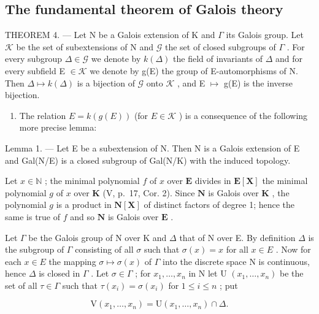 \subsection{The fundamental theorem of Galois theory}

THEOREM 4. --- Let N be a Galois extension of K and \(\Gamma\) its Galois group. Let \(\mathcal{K}\) be the set of subextensions of N and \(\mathcal{G}\) the set of closed subgroups of \(\Gamma\) . For every subgroup \(\Delta \in \mathcal{G}\) we denote by \(k(\Delta)\) the field of invariants of \(\Delta\) and for every subfield E \(\in \mathcal{K}\) we denote by g(E) the group of E-automorphisms of N. Then \(\Delta \mapsto k(\Delta)\) is a bijection of \(\mathcal{G}\) onto \(\mathcal{K}\) , and E \(\mapsto\) g(E) is the inverse bijection.

\begin{enumerate}
\def\labelenumi{\Alph{enumi})}
\tightlist
\item
  The relation \(E = k(g(E))\) (for \(E \in \mathcal{K}\) ) is a consequence of the following more precise lemma:
\end{enumerate}

Lemma 1. --- Let E be a subextension of N. Then N is a Galois extension of E and Gal(N/E) is a closed subgroup of Gal(N/K) with the induced topology.

Let \(x \in \mathbb{N}\) ; the minimal polynomial \(f\) of \(x\) over \(\mathbf{E}\) divides in \(\mathbf{E}[\mathbf{X}]\) the minimal polynomial \(g\) of \(x\) over \(\mathbf{K}\) (V, p.~17, Cor. 2). Since \(\mathbf{N}\) is Galois over \(\mathbf{K}\) , the polynomial \(g\) is a product in \(\mathbf{N}[\mathbf{X}]\) of distinct factors of degree 1; hence the same is true of \(f\) and so \(\mathbf{N}\) is Galois over \(\mathbf{E}\) .

Let \(\Gamma\) be the Galois group of N over K and \(\Delta\) that of N over E. By definition \(\Delta\) is the subgroup of \(\Gamma\) consisting of all \(\sigma\) such that \(\sigma(x) = x\) for all \(x \in E\) . Now for each \(x \in E\) the mapping \(\sigma \mapsto \sigma(x)\) of \(\Gamma\) into the discrete space N is continuous, hence \(\Delta\) is closed in \(\Gamma\) . Let \(\sigma \in \Gamma\) ; for \(x_1, \ldots, x_n\) in N let U \((x_1, \ldots, x_n)\) be the set of all \(\tau \in \Gamma\) such that \(\tau(x_i) = \sigma(x_i)\) for \(1 \leqslant i \leqslant n\) ; put

\[
\mathrm{V} \left(x _ {1}, \dots , x _ {n}\right) = \mathrm{U} \left(x _ {1}, \dots , x _ {n}\right) \cap \Delta .
\]

